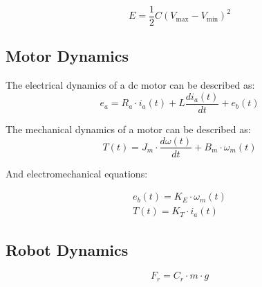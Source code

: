 \begin{equation}
\label{eq:cap2}
E = \frac{1}{2}C(V_{\max} - V_{\min})^{2}
\end{equation}













\subsection{Motor Dynamics}

The electrical dynamics of a dc motor can be described as:
\begin{equation}
	e_{a} = R_{a} \cdot i_{a}(t) + L \frac{di_{a}(t)}{dt} + e_{b}(t)
\end{equation}

The mechanical dynamics of a motor can be described as:
\begin{equation}
T(t) = J_{m} \cdot \frac{d\omega(t)}{dt} + B_{m} \cdot \omega_{m}(t)
\end{equation}

And electromechanical equations:

\begin{equation}
    \begin{gathered}
		e_{b}(t) = K_{E} \cdot \omega_{m}(t) \\
		T(t) = K_{T} \cdot i_{a}(t)
    \end{gathered}
\end{equation}

\subsection{Robot Dynamics}

\begin{equation}
	F_{r} = C_{r} \cdot m \cdot g
\end{equation}

